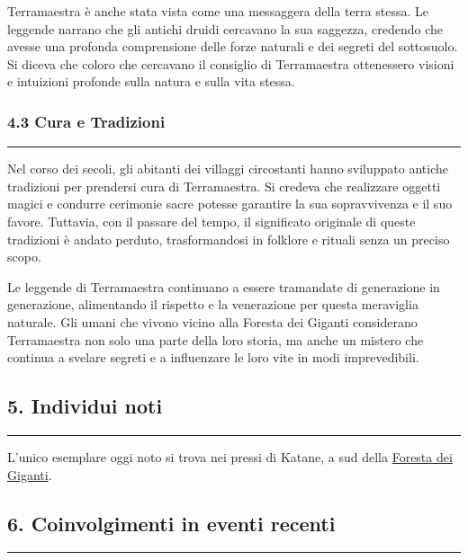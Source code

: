 Terramaestra è anche stata vista come una messaggera della terra stessa.
Le leggende narrano che gli antichi druidi cercavano la sua saggezza,
credendo che avesse una profonda comprensione delle forze naturali e dei
segreti del sottosuolo. Si diceva che coloro che cercavano il consiglio
di Terramaestra ottenessero visioni e intuizioni profonde sulla natura e
sulla vita stessa.

\subsubsection{4.3 Cura e Tradizioni}\label{cura-e-tradizioni}

\begin{center}\rule{0.5\linewidth}{0.5pt}\end{center}

Nel corso dei secoli, gli abitanti dei villaggi circostanti hanno
sviluppato antiche tradizioni per prendersi cura di Terramaestra. Si
credeva che realizzare oggetti magici e condurre cerimonie sacre potesse
garantire la sua sopravvivenza e il suo favore. Tuttavia, con il passare
del tempo, il significato originale di queste tradizioni è andato
perduto, trasformandosi in folklore e rituali senza un preciso scopo.

Le leggende di Terramaestra continuano a essere tramandate di
generazione in generazione, alimentando il rispetto e la venerazione per
questa meraviglia naturale. Gli umani che vivono vicino alla Foresta dei
Giganti considerano Terramaestra non solo una parte della loro storia,
ma anche un mistero che continua a svelare segreti e a influenzare le
loro vite in modi imprevedibili.

\subsection{5. Individui noti}\label{individui-noti}

\begin{center}\rule{0.5\linewidth}{0.5pt}\end{center}

L'unico esemplare oggi noto si trova nei pressi di Katane, a sud della
\href{Foresta\%20dei\%20Giganti\%2003a15f8accd74ec0a08db3f3c9a26b2b.md}{Foresta
dei Giganti}.

\subsection{6. Coinvolgimenti in eventi
recenti}\label{coinvolgimenti-in-eventi-recenti}

\begin{center}\rule{0.5\linewidth}{0.5pt}\end{center}

\href{Untitled\%20c19fe1335df14778aca5a48723ecaab4.csv}{}
